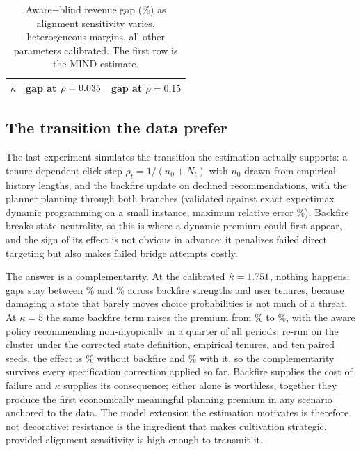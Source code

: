 \documentclass[11pt]{article}
\begin{document}
\begin{table}[ht]
\centering
\caption{Aware$-$blind revenue gap (\%) as alignment sensitivity varies,
heterogeneous margins, all other parameters calibrated. The first row is
the MIND estimate.}
\label{tab:kappa}
\begin{tabular}{rrr}
\toprule
$\kappa$ & gap at $\rho=0.035$ & gap at $\rho=0.15$ \\
\midrule

\end{tabular}
\end{table}

\subsection{The transition the data prefer}

The last experiment simulates the transition the estimation actually
supports: a tenure-dependent click step $\rho_t = 1/(n_0+N_t)$ with $n_0$
drawn from empirical history lengths, and the backfire update on declined
recommendations, with the planner planning through both branches (validated
against exact expectimax dynamic programming on a small instance, maximum
relative error \bfplannererr\%). Backfire breaks state-neutrality, so this
is where a dynamic premium could first appear, and the sign of its
effect is not obvious in advance: it penalizes failed direct targeting but
also makes failed bridge attempts costly.

The answer is a complementarity. At the calibrated
$\hat\kappa=1.751$, nothing happens: gaps stay between
\bfgapmild\% and \bfgapstrong\% across backfire strengths and user
tenures, because damaging a state that barely moves choice probabilities
is not much of a threat. At $\kappa=5$ the same backfire term raises the
premium from \bfgapkfivezero\% to \bfgapkfive\%, with the aware policy
recommending non-myopically in a quarter of all periods; re-run on the
cluster under the corrected state definition, empirical tenures, and ten
paired seeds, the effect is \arcbffivezero\% without backfire and
\arcbffive\% with it, so the complementarity survives every
specification correction applied so far. Backfire supplies the cost of failure and
$\kappa$ supplies its consequence; either alone is worthless, together
they produce the first economically meaningful planning premium in any
scenario anchored to the data. The model extension the estimation
motivates is therefore not decorative: resistance is the ingredient that
makes cultivation strategic, provided alignment sensitivity is high
enough to transmit it.
\end{document}
